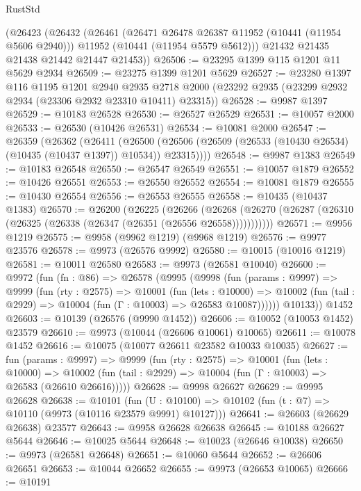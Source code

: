 \begin{lexlean}{RustStd}
\begin{coremodule}
    (@26423
      (@26432
        (@26461
          (@26471 @26478 @26387 @11952 (@10441 (@11954 @5606 @2940)))
          @11952
          (@10441 (@11954 @5579 @5612)))
        @21432
        @21435
        @21438
        @21442
        @21447
        @21453))
@26506 := @23295 @1399 @115 @1201 @11 @5629 @2934
@26509 := @23275 @1399 @1201 @5629
@26527 := @23280
    @1397
    @116
    @1195
    @1201
    @2940
    @2935
    @2718
    @2000
    (@23292 @2935 (@23299 @2932 @2934 (@23306 @2932 @23310 @10411) @23315))
@26528 := @9987 @1397
@26529 := @10183 @26528
@26530 := @26527 @26529
@26531 := @10057 @2000
@26533 := @26530 (@10426 @26531)
@26534 := @10081 @2000
@26547 := @26359
    (@26362
      (@26411
        (@26500 (@26506 (@26509 (@26533 (@10430 @26534) (@10435 (@10437 @1397)) @10534)) @23315))))
@26548 := @9987 @1383
@26549 := @10183 @26548
@26550 := @26547 @26549
@26551 := @10057 @1879
@26552 := @10426 @26551
@26553 := @26550 @26552
@26554 := @10081 @1879
@26555 := @10430 @26554
@26556 := @26553 @26555
@26558 := @10435 (@10437 @1383)
@26570 := @26200
    (@26225
      (@26266
        (@26268 (@26270 (@26287 (@26310 (@26325 (@26338 (@26347 (@26351 (@26556 @26558)))))))))))
@26571 := @9956 @1219
@26575 := @9958 (@9962 @1219) (@9968 @1219)
@26576 := @9977 @23576
@26578 := @9973 (@26576 @9992)
@26580 := @10015 (@10016 @1219)
@26581 := @10011 @26580
@26583 := @9973 (@26581 @10040)
@26600 := @9972
    (fun (fn : @86) =>
    @26578
      (@9995
        (@9998
          (fun (params : @9997) =>
          @9999
            (fun (rty : @2575) =>
            @10001
              (fun (lets : @10000) =>
              @10002 (fun (tail : @2929) => @10004 (fun (Γ : @10003) => @26583 @10087))))))
        @10133))
    @1452
@26603 := @10139 (@26576 (@9990 @1452))
@26606 := @10052 (@10053 @1452) @23579
@26610 := @9973 (@10044 (@26606 @10061) @10065)
@26611 := @10078 @1452
@26616 := @10075 (@10077 @26611 @23582 @10033 @10035)
@26627 := fun (params : @9997) =>
  @9999
    (fun (rty : @2575) =>
    @10001
      (fun (lets : @10000) =>
      @10002 (fun (tail : @2929) => @10004 (fun (Γ : @10003) => @26583 (@26610 @26616)))))
@26628 := @9998 @26627
@26629 := @9995 @26628
@26638 := @10101
    (fun (U : @10100) => @10102 (fun (t : @7) => @10110 (@9973 (@10116 @23579 @9991) @10127)))
@26641 := @26603 (@26629 @26638) @23577
@26643 := @9958 @26628 @26638
@26645 := @10188 @26627 @5644
@26646 := @10025 @5644
@26648 := @10023 (@26646 @10038)
@26650 := @9973 (@26581 @26648)
@26651 := @10060 @5644
@26652 := @26606 @26651
@26653 := @10044 @26652
@26655 := @9973 (@26653 @10065)
@26666 := @10191

\end{coremodule}
\end{lexlean}
